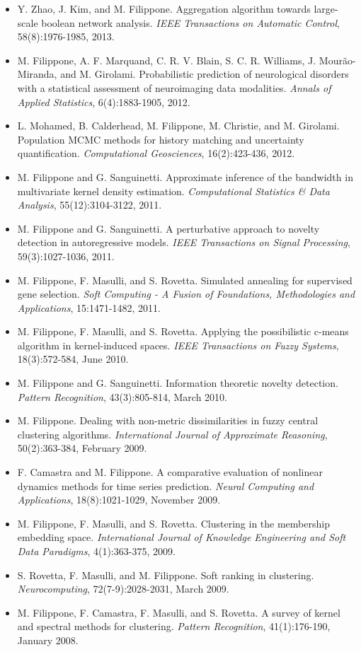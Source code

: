 \begin{itemize}
\item  Y. Zhao, J. Kim, and M. Filippone. Aggregation algorithm towards large-scale boolean network analysis. \emph{IEEE Transactions on Automatic Control}, 58(8):1976-1985, 2013.  
\item  M. Filippone, A. F. Marquand, C. R. V. Blain, S. C. R. Williams, J. Mour\~ao-Miranda, and M. Girolami. Probabilistic prediction of neurological disorders with a statistical assessment of neuroimaging data modalities. \emph{Annals of Applied Statistics}, 6(4):1883-1905, 2012.  
\item  L. Mohamed, B. Calderhead, M. Filippone, M. Christie, and M. Girolami. Population MCMC methods for history matching and uncertainty quantification. \emph{Computational Geosciences}, 16(2):423-436, 2012.  
\item  M. Filippone and G. Sanguinetti. Approximate inference of the bandwidth in multivariate kernel density estimation. \emph{Computational Statistics \& Data Analysis}, 55(12):3104-3122, 2011.  
\item  M. Filippone and G. Sanguinetti. A perturbative approach to novelty detection in autoregressive models. \emph{IEEE Transactions on Signal Processing}, 59(3):1027-1036, 2011.  
\item  M. Filippone, F. Masulli, and S. Rovetta. Simulated annealing for supervised gene selection. \emph{Soft Computing - A Fusion of Foundations, Methodologies and Applications}, 15:1471-1482, 2011.  
\item  M. Filippone, F. Masulli, and S. Rovetta. Applying the possibilistic c-means algorithm in kernel-induced spaces. \emph{IEEE Transactions on Fuzzy Systems}, 18(3):572-584, June 2010.  
\item  M. Filippone and G. Sanguinetti. Information theoretic novelty detection. \emph{Pattern Recognition}, 43(3):805-814, March 2010.  
\item  M. Filippone. Dealing with non-metric dissimilarities in fuzzy central clustering algorithms. \emph{International Journal of Approximate Reasoning}, 50(2):363-384, February 2009.  
\item  F. Camastra and M. Filippone. A comparative evaluation of nonlinear dynamics methods for time series prediction. \emph{Neural Computing and Applications}, 18(8):1021-1029, November 2009.  
\item  M. Filippone, F. Masulli, and S. Rovetta. Clustering in the membership embedding space. \emph{International Journal of Knowledge Engineering and Soft Data Paradigms}, 4(1):363-375, 2009. 
\item  S. Rovetta, F. Masulli, and M. Filippone. Soft ranking in clustering. \emph{Neurocomputing}, 72(7-9):2028-2031, March 2009.  
\item  M. Filippone, F. Camastra, F. Masulli, and S. Rovetta. A survey of kernel and spectral methods for clustering. \emph{Pattern Recognition}, 41(1):176-190, January 2008.  


\end{itemize}
